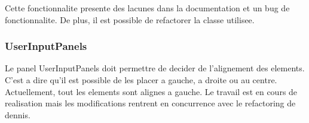 Cette fonctionnalite presente des lacunes dans la documentation \cite{IZPACK-224} et un bug de fonctionnalite\cite{IZPACK-281}. De plus, il est possible de refactorer la classe utilisee\cite{IZPACK-307}.
\subsubsection{UserInputPanels}
Le panel UserInputPanels doit permettre de decider de l'alignement des elements. C'est a dire qu'il est possible de les placer a gauche, a droite ou au centre\cite{IZPACK-176}. Actuellement, tout les elements sont alignes a gauche. Le travail est en cours de realisation mais les modifications rentrent en concurrence avec le refactoring de dennis.